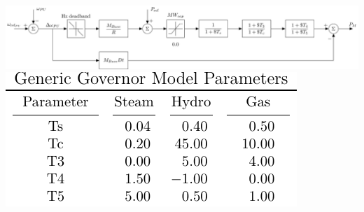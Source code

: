 \documentclass[12pt]{article}
\begin{document}
\centering
\begin{landscape}

\includegraphics[width=\linewidth]{genericGov} \\
\vspace{1.5em}
\includegraphics{../genGovTable/genGovTable}

\end{landscape}
\end{document}
